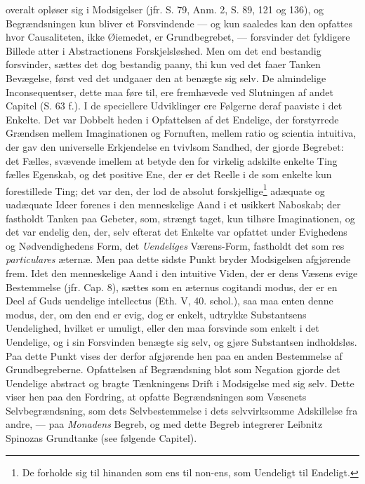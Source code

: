 \documentclass[12pt,a4paper]{book}
\newcommand{\opage}[1]{\marginnote{\footnotesize\textit{[#1]}}}
\begin{document}
overalt opløser sig i Modsigelser (jfr. S. 79, Anm. 2, S. 89,
121 og 136), og Begrændsningen kun bliver et Forsvindende
--- og kun saaledes kan den opfattes hvor Causaliteten, ikke
Øiemedet, er Grundbegrebet, --- forsvinder det fyldigere
Billede atter i Abstractionens Forskjelsløshed. Men om det
end bestandig forsvinder, sættes det dog bestandig paany,
thi kun ved det faaer Tanken Bevægelse, først ved det undgaaer
den at benægte sig selv. De almindelige Inconsequentser,
dette maa føre til, ere fremhævede ved Slutningen
af andet Capitel (S. 63 f.). I de speciellere Udviklinger ere
Følgerne deraf paaviste i det Enkelte. Det var Dobbelt\-%
\opage{177}\setcounter{footnote}{0}%
heden i Opfattelsen af det Endelige, der forstyrrede Grændsen
mellem Imaginationen og Fornuften, mellem ratio og
scientia intuitiva, der gav den universelle Erkjendelse en tvivlsom
Sandhed, der gjorde Begrebet: det Fælles, svævende
imellem at betyde den for virkelig adskilte enkelte Ting
fælles Egenskab, og det positive Ene, der er det Reelle i
de som enkelte kun forestillede Ting; det var den, der lod
de absolut forskjellige\footnote{De forholde sig til hinanden som
ens til non-ens, som Uendeligt til Endeligt.} adæquate og
uadæquate Ideer forenes i den menneskelige Aand i et
usikkert Naboskab; der fastholdt Tanken paa Gebeter, som,
strængt taget, kun tilhøre Imaginationen, og det var endelig
den, der, selv efterat det Enkelte var opfattet under
Evighedens og Nødvendighedens Form, det \emph{Uendeliges} Værens-Form,
fastholdt det som res \emph{particulares} æternæ. Men
paa dette sidste Punkt bryder Modsigelsen afgjørende frem.
Idet den menneskelige Aand i den intuitive Viden, der er
dens Væsens evige Bestemmelse (jfr. Cap. 8), sættes som en
æternus cogitandi modus, der er en Deel af Guds uendelige
intellectus (Eth. V, 40. schol.), saa maa enten denne modus,
der, om den end er evig, dog er enkelt, udtrykke Substantsens
Uendelighed, hvilket er umuligt, eller den maa forsvinde
som enkelt i det Uendelige, og i sin Forsvinden benægte
sig selv, og gjøre Substantsen indholdsløs. Paa dette
Punkt vises der derfor afgjørende hen paa en anden Bestemmelse
af Grundbegreberne. Opfattelsen af Begrændsning
blot som Negation gjorde det Uendelige abstract og
bragte Tænkningens Drift i Modsigelse med sig selv. Dette
viser hen paa den Fordring, at opfatte Begrændsningen som
Væsenets Selvbegrændsning, som dets Selvbestemmelse i
dets selvvirksomme Adskillelse fra andre, --- paa \emph{Monadens}
Begreb, og med dette Begreb integrerer Leibnitz Spinozas
Grundtanke (see følgende Capitel).
\end{document}
